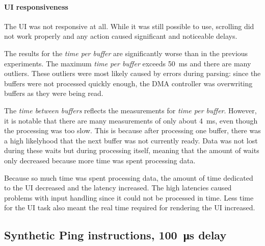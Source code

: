 \paragraph{UI responsiveness}

The UI was not responsive at all. While it was still possible to use, scrolling did not work properly
and any action caused significant and noticeable delays.
\bigbreak

The results for the \textit{time per buffer} are significantly worse than in the previous experiments.
The maximum \textit{time per buffer} exceeds \SI{50}{\milli\second} and there are many outliers.
These outliers were most likely caused by errors during parsing: since the buffers were not processed
quickly enough, the DMA controller was overwriting buffers as they were being read.

The \textit{time between buffers} reflects the measurements for \textit{time per buffer}. However,
it is notable that there are many measurements of only about \SI{4}{\milli\second}, even though the
processing was too slow. This is because after processing one buffer, there was a high likelyhood
that the next buffer was not currently ready. Data was not lost during these waits but during
processing itself, meaning that the amount of waits only decreased because more time was spent
processing data.

Because so much time was spent processing data, the amount of time dedicated to the UI decreased and
the latency increased. The high latencies caused problems with input handling since it could not be
processed in time. Less time for the UI task also meant the real time required for rendering the UI
increased.

\clearpage
\subsection{Synthetic Ping instructions, \SI{100}{\micro\second} delay}
\label{evaluation/results/synthetic-ping-instructions-100us-delay}

